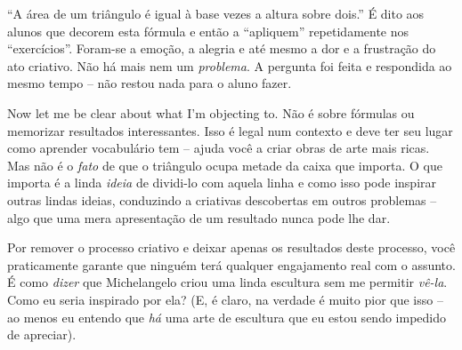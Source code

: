 \documentclass[a4paper,oneside,12pt,notitlepage]{article}
\begin{document}
\vspace{1em}

``A área de um triângulo é igual à base vezes a altura sobre dois.''
É dito aos alunos que decorem esta fórmula e então a ``apliquem'' repetidamente nos ``exercícios''.
Foram-se a emoção, a alegria e até mesmo a dor e a frustração do ato criativo.
Não há mais nem um \textsl{problema}.
A pergunta foi feita e respondida ao mesmo tempo -- não restou nada para o aluno fazer.

Now let me be clear about what I'm objecting to.
Não é sobre fórmulas ou memorizar resultados interessantes.
Isso é legal num contexto e deve ter seu lugar como aprender vocabulário tem -- ajuda você a criar obras de arte mais ricas.
Mas não é o \textsl{fato} de que o triângulo ocupa metade da caixa que importa.
O que importa é a linda \textsl{ideia} de dividi-lo com aquela linha e como isso pode inspirar outras lindas ideias, conduzindo a criativas descobertas em outros problemas -- algo que uma mera apresentação de um resultado nunca pode lhe dar.

Por remover o processo criativo e deixar apenas os resultados deste processo, você praticamente garante que ninguém terá qualquer engajamento real com o assunto.
É como \textsl{dizer} que Michelangelo criou uma linda escultura sem me permitir \textsl{vê-la}.
Como eu seria inspirado por ela?
(E, é claro, na verdade é muito pior que isso -- ao menos eu entendo que \textsl{há} uma arte de escultura que eu estou sendo impedido de apreciar).

\end{document}
